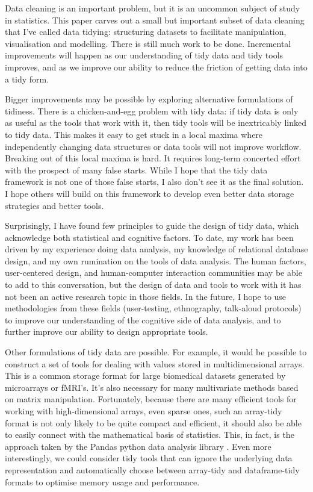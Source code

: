 \documentclass[article]{jss}
\begin{document}
Data cleaning is an important problem, but it is an uncommon subject of study in statistics. This paper carves out a small but important subset of data cleaning that I've called data tidying: structuring datasets to facilitate manipulation, visualisation and modelling. There is still much work to be done. Incremental improvements will happen as our understanding of tidy data and tidy tools improves, and as we improve our ability to reduce the friction of getting data into a tidy form.

Bigger improvements may be possible by exploring alternative formulations of tidiness. There is a chicken-and-egg problem with tidy data: if tidy data is only as useful as the tools that work with it, then tidy tools will be inextricably linked to tidy data. This makes it easy to get stuck in a local maxima where independently changing data structures or data tools will not improve workflow. Breaking out of this local maxima is hard. It requires long-term concerted effort with the prospect of many false starts. While I hope that the tidy data framework is not one of those false starts, I also don't see it as the final solution. I hope others will build on this framework to develop even better data storage strategies and better tools.

Surprisingly, I have found few principles to guide the design of tidy data, which acknowledge both statistical and cognitive factors. To date, my work has been driven by my experience doing data analysis, my knowledge of relational database design, and my own rumination on the tools of data analysis. The human factors, user-centered design, and human-computer interaction communities may be able to add to this conversation, but the design of data and tools to work with it has not been an active research topic in those fields. In the future, I hope to use methodologies from these fields (user-testing, ethnography, talk-aloud protocols) to improve our understanding of the cognitive side of data analysis, and to further improve our ability to design appropriate tools.

Other formulations of tidy data are possible. For example, it would be possible to construct a set of tools for dealing with values stored in multidimensional arrays. This is a common storage format for large biomedical datasets generated by microarrays or fMRI's. It's also necessary for many multivariate methods based on matrix manipulation. Fortunately, because there are many efficient tools for working with high-dimensional arrays, even sparse ones, such an array-tidy format is not only likely to be quite compact and efficient, it should also be able to easily connect with the mathematical basis of statistics. This, in fact, is the approach taken by the Pandas python data analysis library \citep{mckinney:2010}. Even more interestingly, we could consider tidy tools that can ignore the underlying data representation and automatically choose between array-tidy and dataframe-tidy formats to optimise memory usage and performance.
\end{document}
